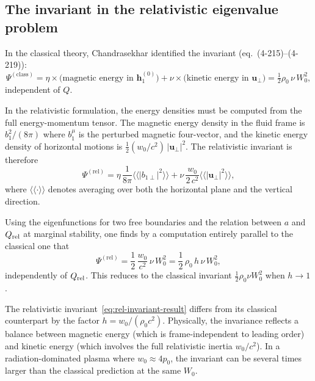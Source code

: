 \subsection{The invariant in the relativistic eigenvalue problem}
\label{subsec:rel-45-invariant}

In the classical theory, Chandrasekhar identified the invariant
(eq.~(4-215)--(4-219)):
\[
  \Psi^{(\mathrm{class})}
  = \eta\times\text{(magnetic energy in }\mathbf{h}_{1}^{(0)})
  + \nu\times\text{(kinetic energy in }\mathbf{u}_{\perp})
  = \tfrac{1}{2}\rho_{0}\,\nu\,W_{0}^{2} ,
\]
independent of $Q$.

In the relativistic formulation, the energy densities must be
computed from the full energy-momentum tensor.  The magnetic energy
density in the fluid frame is $b_{1}^{2}/(8\pi)$ where $b_{1}^{\mu}$
is the perturbed magnetic four-vector, and the kinetic energy density
of horizontal motions is $\tfrac{1}{2}(w_{0}/c^{2})\,|\mathbf{u}_{\perp}|^{2}$.
The relativistic invariant is therefore
\begin{equation}
  \Psi^{(\mathrm{rel})}
  = \eta\,\frac{1}{8\pi}
    \langle\langle |b_{1\perp}|^{2}\rangle\rangle
  + \nu\,\frac{w_{0}}{2\,c^{2}}
    \langle\langle |\mathbf{u}_{\perp}|^{2}\rangle\rangle ,
  \label{eq:rel-invariant-def}
\end{equation}
where $\langle\langle\cdot\rangle\rangle$ denotes averaging over both
the horizontal plane and the vertical direction.

Using the eigenfunctions for two free boundaries and the relation between
$a$ and $Q_{\mathrm{rel}}$ at marginal stability, one finds by a computation
entirely parallel to the classical one that
\begin{equation}
  \boxed{\;
  \Psi^{(\mathrm{rel})}
  = \frac{1}{2}\,\frac{w_{0}}{c^{2}}\,\nu\,W_{0}^{2}
  = \frac{1}{2}\,\rho_{0}\,h\,\nu\,W_{0}^{2} ,\;}
  \label{eq:rel-invariant-result}
\end{equation}
independently of $Q_{\mathrm{rel}}$.  This reduces to the classical invariant
$\tfrac{1}{2}\rho_{0}\nu W_{0}^{2}$ when $h\to 1$.

\begin{relcorrection}
The relativistic invariant~\eqref{eq:rel-invariant-result} differs from
its classical counterpart by the factor $h = w_{0}/(\rho_{0}c^{2})$.
Physically, the invariance reflects a balance between magnetic energy
(which is frame-independent to leading order) and kinetic energy
(which involves the full relativistic inertia $w_{0}/c^{2}$).  In a
radiation-dominated plasma where $w_{0}\approx 4p_{0}$, the invariant
can be several times larger than the classical prediction at the same
$W_{0}$.
\end{relcorrection}


